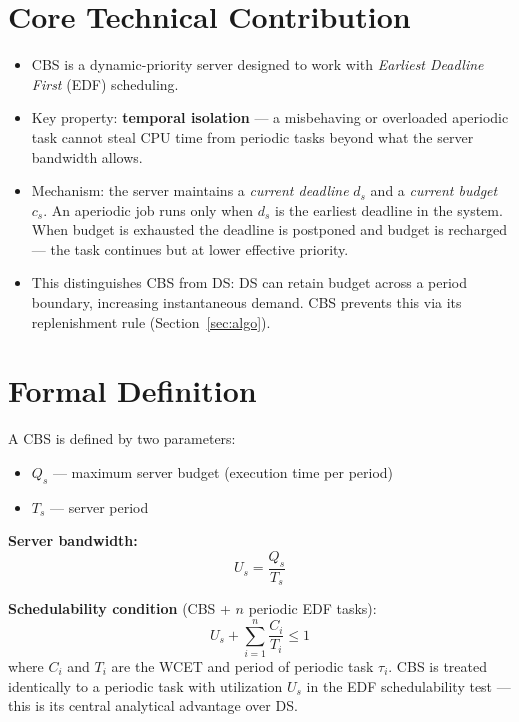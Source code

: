 \documentclass[conference]{IEEEtran}
\begin{document}
\section{Core Technical Contribution}

\begin{itemize}
  \item CBS is a dynamic-priority server designed to work with
        \emph{Earliest Deadline First} (EDF) scheduling.
  \item Key property: \textbf{temporal isolation} --- a misbehaving or
        overloaded aperiodic task cannot steal CPU time from periodic
        tasks beyond what the server bandwidth allows.
  \item Mechanism: the server maintains a \emph{current deadline}
        $d_s$ and a \emph{current budget} $c_s$. An aperiodic job runs
        only when $d_s$ is the earliest deadline in the system. When
        budget is exhausted the deadline is postponed and budget is
        recharged --- the task continues but at lower effective priority.
  \item This distinguishes CBS from DS: DS can retain budget across a
        period boundary, increasing instantaneous demand. CBS prevents
        this via its replenishment rule (Section~\ref{sec:algo}).
\end{itemize}

\section{Formal Definition}

A CBS is defined by two parameters:
\begin{itemize}
  \item $Q_s$ --- maximum server budget (execution time per period)
  \item $T_s$ --- server period
\end{itemize}

\noindent\textbf{Server bandwidth:}
\begin{equation}
  U_s = \frac{Q_s}{T_s}
  \label{eq:bandwidth}
\end{equation}

\noindent\textbf{Schedulability condition} (CBS + $n$ periodic EDF tasks):
\begin{equation}
  U_s + \sum_{i=1}^{n} \frac{C_i}{T_i} \leq 1
  \label{eq:sched}
\end{equation}
where $C_i$ and $T_i$ are the WCET and period of periodic task
$\tau_i$. CBS is treated identically to a periodic task with
utilization $U_s$ in the EDF schedulability test --- this is its
central analytical advantage over DS.
\end{document}
